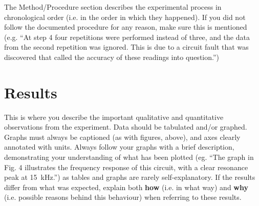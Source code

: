 \documentclass[11pt, a4paper]{article}
\begin{document}
The Method/Procedure section describes the experimental process in chronological order (i.e. in the order in which they happened). If you did not follow the documented procedure for any reason, make sure this is mentioned (e.g. ``At step 4 four repetitions were performed instead of three, and the data from the second repetition was ignored. This is due to a circuit fault that was discovered that called the accuracy of these readings into question.'')

%


\section{Results}

This is where you describe the important qualitative and quantitative observations from the experiment. Data should be tabulated and/or graphed. Graphs must always be captioned (as with figures, above), and axes clearly annotated with units. Always follow your graphs with a brief description, demonstrating your understanding of what has been plotted (eg. ``The graph in Fig. 4 illustrates the frequency response of this circuit, with a clear resonance peak at 15~kHz.'') as tables and graphs are rarely self-explanatory. If the results differ from what was expected, explain both \textbf{how} (i.e. in what way) and \textbf{why} (i.e. possible reasons behind this behaviour) when referring to these results. 

%
\end{document}
